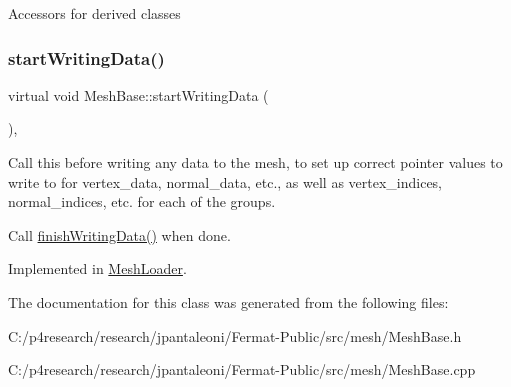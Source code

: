Accessors for derived classes \mbox{\label{class_mesh_base_a67eb9bc7c4f6b074626078fe7779a8a4}} 
\subsubsection{\texorpdfstring{start\+Writing\+Data()}{startWritingData()}}
{\footnotesize\ttfamily virtual void Mesh\+Base\+::start\+Writing\+Data (\begin{DoxyParamCaption}{ }\end{DoxyParamCaption})\hspace{0.3cm}{\ttfamily [protected]}, {}}

Call this before writing any data to the mesh, to set up correct pointer values to write to for vertex\+\_\+data, normal\+\_\+data, etc., as well as vertex\+\_\+indices, normal\+\_\+indices, etc. for each of the groups.

Call \hyperlink{class_mesh_base_a000796d7b04985f137d5a1368e90bcc6}{finish\+Writing\+Data()} when done. 

Implemented in \hyperlink{class_mesh_loader_a18379e41707d8127947aa17a622d2807}{Mesh\+Loader}.



The documentation for this class was generated from the following files\+:\begin{DoxyCompactItemize}
\item 
C\+:/p4research/research/jpantaleoni/\+Fermat-\/\+Public/src/mesh/Mesh\+Base.\+h\item 
C\+:/p4research/research/jpantaleoni/\+Fermat-\/\+Public/src/mesh/Mesh\+Base.\+cpp\end{DoxyCompactItemize}
